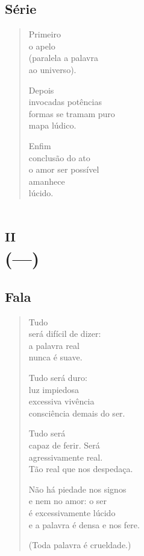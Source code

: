 \chapter{Série}

\begin{verse}
Primeiro\\
o apelo\\
(paralela a palavra\\
ao universo).

Depois\\
invocadas potências\\
formas se tramam puro\\
mapa lúdico.

Enfim\\
conclusão do ato\\
o amor ser possível\\
amanhece\\
lúcido.
\end{verse}

\part*{\textsc{ii}\\ (---)}

\chapter{Fala}

\begin{verse}
Tudo\\
será difícil de dizer:\\
a palavra real\\
nunca é suave.

Tudo será duro:\\
luz impiedosa\\
excessiva vivência\\
consciência demais do ser.

Tudo será\\
capaz de ferir. Será\\
agressivamente real.\\
Tão real que nos despedaça.

Não há piedade nos signos\\
e nem no amor: o ser\\
é excessivamente lúcido\\
e a palavra é densa e nos fere.

(Toda palavra é crueldade.)
\end{verse}

